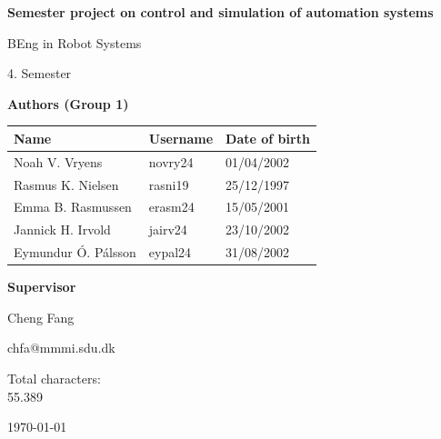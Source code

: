 \documentclass[11pt, a4paper]{report}
\begin{document}
	\begin{titlepage}
		\centering
		{\Huge \textbf{Semester project on control and simulation of automation systems} \par} %
		\vspace{1.5cm}
		
		{\LARGE BEng in Robot Systems \par} %
		\vspace{0cm}
		
		{\Large 4. Semester \par} %
		\vspace{1.5cm}
		
		{\Large \textbf{Authors (Group 1)} \par} %
		\vspace{0.5cm}
		
		\begin{tabular}{l l l}
			Name & Username & Date of birth \\ 
			\hline
			Noah V. Vryens & novry24 & 01/04/2002 \\
			Rasmus K. Nielsen & rasni19 & 25/12/1997 \\
			Emma B. Rasmussen & erasm24 & 15/05/2001 \\
			Jannick H. Irvold & jairv24 & 23/10/2002 \\
			Eymundur Ó. Pálsson & eypal24 & 31/08/2002 \\
		\end{tabular}
		\vspace{2cm}
		
		{\Large \textbf{Supervisor} \par}
		\vspace{0.5cm}
		
		Cheng Fang \par
		chfa@mmmi.sdu.dk \par
		
		\vfill
		Total characters: \\
		55.389
		\vspace{1cm}
		
		{\large \today} %
	\end{titlepage}
	
	
	
	
	\clearpage
	\begingroup
	\enlargethispage{2\baselineskip} %
	\renewcommand{\baselinestretch}{0.95} %
	\selectfont
	\tableofcontents
	\clearpage
	\endgroup
	
	
	
	
	
	
	
	
	 
	
	
	
	
	\appendix
	

	
\end{document}
